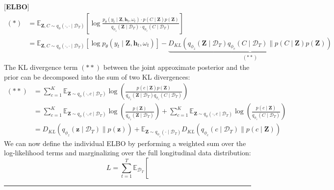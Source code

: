 \documentclass[10pt]{article} %
\newcommand{\BlackBox}{\rule{1.5ex}{1.5ex}}  %
\renewenvironment{proof}{\par\noindent{\bf Proof\ }}{\hfill\BlackBox\\[2mm]}
\newenvironment{proof}{\par\noindent{\bf Proof\ }}{\hfill\BlackBox\\[2mm]}
\begin{document}
\begin{proof}[\textbf{ELBO}]
\begin{align*}
(*) &= 
\mathbb{E}_{\mathbf{Z}, C \sim q_{\phi}(\cdot , \cdot \mid \mathcal{D}_T)} 
\left[  
    \log \frac{
        p_\theta(y_{t} \mid \mathbf{Z}, \mathbf{h}_{t}, \omega_{t}) \cdot p(C \mid \mathbf{Z})p(\mathbf{Z})
    }{
        q_{\phi_z}(\mathbf{Z} \mid \mathcal{D}_T) \cdot q_{\phi_c}(C \mid \mathcal{D}_T)
    } 
\right] \\
&= \mathbb{E}_{\mathbf{Z}, C \sim q_{\phi}(\cdot , \cdot \mid \mathcal{D}_T)} 
    \left[
        \log p_\theta(y_{t} \mid \mathbf{Z}, \mathbf{h}_{t}, \omega_{t})
    \right] 
    - \underbrace{D_{KL}(q_{\phi_z}(\mathbf{Z} \mid \mathcal{D}_T)  q_{\phi_c}(C \mid \mathcal{D}_T) 
    \parallel p(C \mid \mathbf{Z})p(\mathbf{Z}))}_{(**)}
\end{align*}
The KL divergence term \((**)\) between the joint approximate posterior and the prior can be decomposed into the sum of two KL divergences:
\begin{align*}
(**) &= \sum_{c=1}^{K}
        \mathbb{E}_{\mathbf{Z} \sim q_{\phi}(\cdot , c \mid \mathcal{D}_T)} 
        \log \left(
            \frac{
                p(c \mid \mathbf{Z})p(\mathbf{Z})
            }{
                q_{\phi_z}(\mathbf{Z} \mid \mathcal{D}_T)  q_{\phi_c}(C \mid \mathcal{D}_T)
            }
        \right) \\
&= \sum_{c=1}^{K}
        \mathbb{E}_{\mathbf{Z} \sim q_{\phi}(\cdot , c \mid \mathcal{D}_T)} 
        \log \left(
            \frac{
                p(\mathbf{Z})
            }{
                q_{\phi_z}(\mathbf{Z} \mid \mathcal{D}_T)
            }
        \right) 
    + \sum_{c=1}^{K}
        \mathbb{E}_{\mathbf{Z} \sim q_{\phi}(\cdot , c \mid \mathcal{D}_T)} 
        \log \left(
            \frac{
                p(c \mid \mathbf{Z})
            }{
                q_{\phi_c}(C \mid \mathcal{D}_T)
            }
        \right) \\ 
&= D_{KL}\left(
        q_{\phi_z}(\mathbf{z} \mid \mathcal{D}_T) 
        \parallel p(\mathbf{z})
    \right) 
    + \mathbb{E}_{\mathbf{Z} \sim q_{\phi_z}(\cdot \mid \mathcal{D}_T)} 
        D_{KL}\left(
            q_{\phi_c}(c \mid \mathcal{D}_T) 
            \parallel p(c \mid \mathbf{Z})
        \right)
\end{align*}
We can now define the individual ELBO by performing a weighted sum over the log-likelihood terms and marginalizing over the full longitudinal data distribution:
\begin{equation*}
L = \sum_{t=1}^{T} 
    \mathbb{E}_{\mathcal{D}_T}
        \left[

\end{equation*}
\end{proof}
\end{document}
